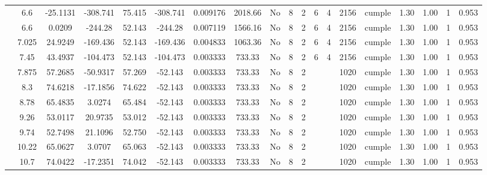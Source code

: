 \begin{table}[H]
{\begin{tabular}{|c|c|c|c|c|c|r|c|c|c|c|c|c|c|c|c|c|c|c|}
\cline{2-19}        & \cellcolor[rgb]{ .851,  .882,  .949}6.6 & -25.1131 & -308.741 & 75.415 & -308.741 & 0.009176 & 2018.66 & No  & 8   & 2   & 6   & 4   & 2156 & \cellcolor[rgb]{ .776,  .937,  .808}cumple & 1.30 & 1.00 & 1   & 0.953 \bigstrut\\
\cline{2-19}        & \cellcolor[rgb]{ .851,  .882,  .949}6.6 & 0.0209 & -244.28 & 52.143 & -244.28 & 0.007119 & 1566.16 & No  & 8   & 2   & 6   & 4   & 2156 & \cellcolor[rgb]{ .776,  .937,  .808}cumple & 1.30 & 1.00 & 1   & 0.953 \bigstrut\\
\cline{2-19}        & 7.025 & 24.9249 & -169.436 & 52.143 & -169.436 & 0.004833 & 1063.36 & No  & 8   & 2   & 6   & 4   & 2156 & \cellcolor[rgb]{ .776,  .937,  .808}cumple & 1.30 & 1.00 & 1   & 0.953 \bigstrut\\
\cline{2-19}        & 7.45 & 43.4937 & -104.473 & 52.143 & -104.473 & 0.003333 & 733.33 & No  & 8   & 2   & 6   & 4   & 2156 & \cellcolor[rgb]{ .776,  .937,  .808}cumple & 1.30 & 1.00 & 1   & 0.953 \bigstrut\\
\cline{2-19}        & 7.875 & 57.2685 & -50.9317 & 57.269 & -52.143 & 0.003333 & 733.33 & No  & 8   & 2   &     &     & 1020 & \cellcolor[rgb]{ .776,  .937,  .808}cumple & 1.30 & 1.00 & 1   & 0.953 \bigstrut\\
\cline{2-19}        & 8.3 & 74.6218 & -17.1856 & 74.622 & -52.143 & 0.003333 & 733.33 & No  & 8   & 2   &     &     & 1020 & \cellcolor[rgb]{ .776,  .937,  .808}cumple & 1.30 & 1.00 & 1   & 0.953 \bigstrut\\
\cline{2-19}        & 8.78 & 65.4835 & 3.0274 & 65.484 & -52.143 & 0.003333 & 733.33 & No  & 8   & 2   &     &     & 1020 & \cellcolor[rgb]{ .776,  .937,  .808}cumple & 1.30 & 1.00 & 1   & 0.953 \bigstrut\\
\cline{2-19}        & 9.26 & 53.0117 & 20.9735 & 53.012 & -52.143 & 0.003333 & 733.33 & No  & 8   & 2   &     &     & 1020 & \cellcolor[rgb]{ .776,  .937,  .808}cumple & 1.30 & 1.00 & 1   & 0.953 \bigstrut\\
\cline{2-19}        & 9.74 & 52.7498 & 21.1096 & 52.750 & -52.143 & 0.003333 & 733.33 & No  & 8   & 2   &     &     & 1020 & \cellcolor[rgb]{ .776,  .937,  .808}cumple & 1.30 & 1.00 & 1   & 0.953 \bigstrut\\
\cline{2-19}        & 10.22 & 65.0627 & 3.0707 & 65.063 & -52.143 & 0.003333 & 733.33 & No  & 8   & 2   &     &     & 1020 & \cellcolor[rgb]{ .776,  .937,  .808}cumple & 1.30 & 1.00 & 1   & 0.953 \bigstrut\\
\cline{2-19}        & 10.7 & 74.0422 & -17.2351 & 74.042 & -52.143 & 0.003333 & 733.33 & No  & 8   & 2   &     &     & 1020 & \cellcolor[rgb]{ .776,  .937,  .808}cumple & 1.30 & 1.00 & 1   & 0.953 \bigstrut\\

\end{tabular}}
\end{table}
